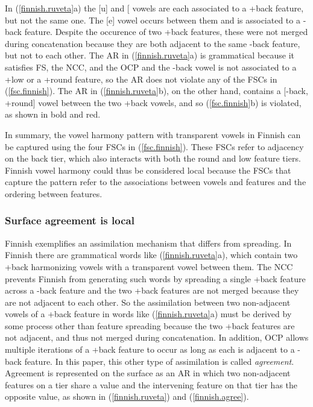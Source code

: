 \documentclass[,doc,floatsintext]{apa6}
\theoremstyle{definition}
\theoremstyle{definition}
\theoremstyle{definition}
\theoremstyle{remark}
\begin{document}
In (\ref{finnish.ruveta}a) the {[}u{]} and {[}\textipa{A}{]} vowels are
each associated to a +back feature, but not the same one. The {[}e{]}
vowel occurs between them and is associated to a -back feature. Despite
the occurence of two +back features, these were not merged during
concatenation because they are both adjacent to the same -back feature,
but not to each other. The AR in (\ref{finnish.ruveta}a) is grammatical
because it satisfies FS, the NCC, and the OCP and the -back vowel is not
associated to a +low or a +round feature, so the AR does not violate any
of the FSCs in (\ref{fsc.finnish}). The AR in (\ref{finnish.ruveta}b),
on the other hand, contains a {[}-back, +round{]} vowel between the two
+back vowels, and so (\ref{fsc.finnish}b) is violated, as shown in bold
and red.

In summary, the vowel harmony pattern with transparent vowels in Finnish
can be captured using the four FSCs in (\ref{fsc.finnish}). These FSCs
refer to adjacency on the back tier, which also interacts with both the
round and low feature tiers. Finnish vowel harmony could thus be
considered local because the FSCs that capture the pattern refer to the
associations between vowels and features and the ordering between
features.

\subsubsection{Surface agreement is
local}\label{surface-agreement-is-local}

Finnish exemplifies an assimilation mechanism that differs from
spreading. In Finnish there are grammatical words like
(\ref{finnish.ruveta}a), which contain two +back harmonizing vowels with
a transparent vowel between them. The NCC prevents Finnish from
generating such words by spreading a single +back feature across a -back
feature and the two +back features are not merged because they are not
adjacent to each other. So the assimilation between two non-adjacent
vowels of a +back feature in words like (\ref{finnish.ruveta}a) must be
derived by some process other than feature spreading because the two
+back features are not adjacent, and thus not merged during
concatenation. In addition, OCP allows multiple iterations of a +back
feature to occur as long as each is adjacent to a -back feature. In this
paper, this other type of assimilation is called \emph{agreement}.
Agreement is represented on the surface as an AR in which two
non-adjacent features on a tier share a value and the intervening
feature on that tier has the opposite value, as shown in
(\ref{finnish.ruveta}) and (\ref{finnish.agree}).
\end{document}

